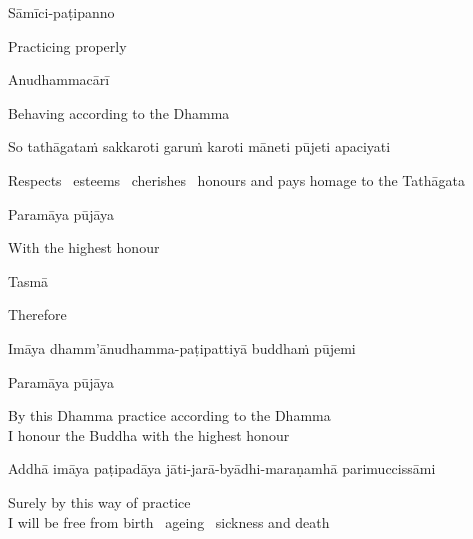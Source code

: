 Sāmīci-paṭipanno

\begin{english}
  Practicing properly
\end{english}

Anudhammacārī

\begin{english}
  Behaving according to the Dhamma
\end{english}

\begin{pali-hang}
So tathāgataṁ sakkaroti garuṁ karoti māneti pūjeti apaciyati
\end{pali-hang}

\begin{english-hang}
  Respects \breathmark\ esteems \breathmark\ cherishes \breathmark\ honours and pays homage to the Tathāgata
\end{english-hang}

Paramāya pūjāya

\begin{english}
  With the highest honour
\end{english}

\suttaRef{[DN 16]}

\ifninebythirteen\clearpage\fi

Tasmā

\begin{english}
  Therefore
\end{english}

\begin{pali-hang-first-line}
Imāya dhamm'ānudhamma-paṭipattiyā buddhaṁ pūjemi\\
\end{pali-hang-first-line}
\begin{pali-hang-together}
Paramāya pūjāya
\end{pali-hang-together}

\begin{english}
  By this Dhamma practice according to the Dhamma\\
  I honour the Buddha with the highest honour
\end{english}

\begin{pali-hang}
  Addhā imāya paṭipadāya jāti-jarā-byādhi-maraṇamhā parimuccissāmi
\end{pali-hang}

\begin{english}
  Surely by this way of practice\\
  I will be free from birth \breathmark\ ageing \breathmark\ sickness and death
\end{english}


